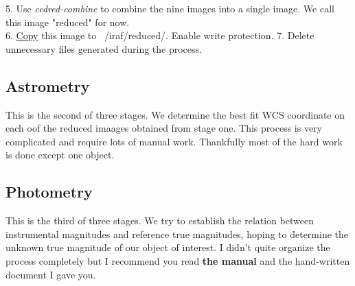 \documentclass{article}
\begin{document}
5. Use \emph{ccdred-combine} to combine the nine images into a single image. We call this image "reduced" for now.\\

6. \underline{Copy} this image to ~/iraf/reduced/. Enable write protection.
7. Delete unnecessary files generated during the process.\\

\subsection{Astrometry}
This is the second of three stages. We determine the best fit WCS coordinate on each oof the reduced imaages obtained from stage one. This process is very complicated and require lots of manual work. Thankfully most of the hard work is done except one object.
\subsection{Photometry}
This is the third of three stages. We try to establish the relation between instrumental magnitudes and reference true magnitudes, hoping to determine the unknown true magnitude of our object of interest. I didn't quite organize the process completely but I recommend you read\textbf{ the manual} and the hand-written document I gave you.
\end{document}
